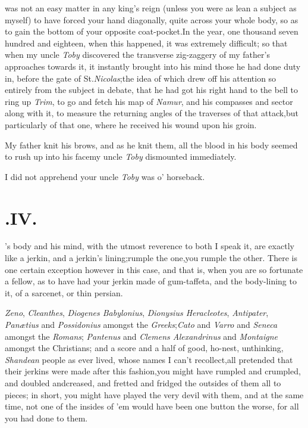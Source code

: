 \documentclass{article}
\begin{document}
 was not an easy matter in any
king’s reign (unless you were as lean a subject as myself) to
have forced your hand diagonally, quite across your whole body, so
as to gain the bottom of your opposite coat-pocket.\tsh In
the year, one thousand seven hundred and eighteen, when this
happened, it was extremely difficult; so that when my uncle
\textit{Toby} discovered the transverse zig-zaggery of my
father’s approaches towards it, it instantly brought into his
mind those he had done duty in, before the gate of
St.\@ \textit{Nicolas};\tsk the idea of which drew off his attention so
entirely from the subject in debate, that he had got his right
hand to the bell to ring up \textit{Trim}, to go and fetch
his map of \textit{Namur}, and his compasses and sector along with
it, to measure the returning angles of the traverses of that
attack,\tsk but particularly of that one, where he received his
wound upon his groin.

My father knit his brows, and as he knit them, all the blood in
his body seemed to rush up into his face\tsh my uncle
\textit{Toby} dismounted immediately.

\tsh I did not apprehend your uncle \textit{Toby} was
o’ horseback.\tsh

\section{.\quad  IV.}

’s body and his mind, with
the utmost reverence to both I speak it, are exactly like a jerkin,
and a jerkin’s lining;\tsk rumple the one,\tsk you rumple
the other. There is one certain exception however in this case, and
that is, when you are so fortunate a fellow, as to have had your
jerkin made of gum-taffeta, and the body-lining to it, of a
sarcenet, or thin persian.

\textit{Zeno}, \textit{Cleanthes}, \textit{Diogenes Babylonius}, 
\textit{Dionysius Heracleotes}, \textit{Antipater}, \textit{Panætius} and
\textit{Possidonius} amongst the \textit{Greeks};\tsh \textit{Cato} and
\textit{Varro} and \textit{Seneca} amongst the \textit{Romans};\tsk
\textit{Pantenus} and \textit{Clemens Alexan\-drinus} and \textit{Montaigne} amongst
the Christians; and a score and a half of good, ho-\break nest, unthinking, \textit{Shandean}
people as ever lived, whose names I can’t recollect,\tsk all pretended that their
jerkins were made after this fashion,\tsk you might have rumpled and crumpled, and
doubled and\break creased, and fretted and fridged the outsides of them all to pieces;\tsk
in short, you might have played the very devil with them, and at the same time,
not
one of the insides of ’em would have been one button the worse, for all you had
done to them.
\end{document}
